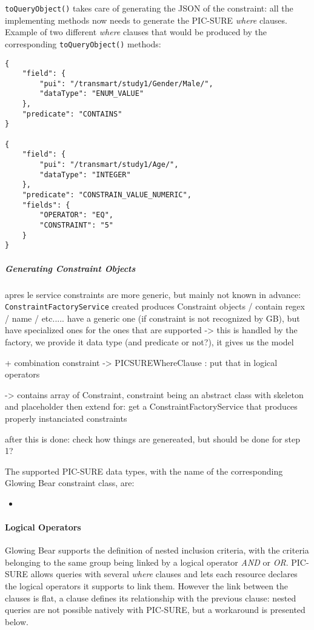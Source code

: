 \verb|toQueryObject()| takes care of generating the JSON of the constraint: all the implementing methods now needs to generate the PIC-SURE \emph{where} clauses.
Example of two different \emph{where} clauses that would be produced by the corresponding \verb|toQueryObject()| methods:
\begin{verbatim}
{
    "field": {
        "pui": "/transmart/study1/Gender/Male/",
        "dataType": "ENUM_VALUE"
    },
    "predicate": "CONTAINS"
}

{
    "field": {
        "pui": "/transmart/study1/Age/",
        "dataType": "INTEGER"
    },
    "predicate": "CONSTRAIN_VALUE_NUMERIC",
    "fields": {
        "OPERATOR": "EQ",
        "CONSTRAINT": "5"
    }
}
\end{verbatim}

\subparagraph{Generating Constraint Objects}

apres le service
constraints are more generic, but mainly not known in advance: \verb|ConstraintFactoryService| created
produces Constraint objects / contain regex / name / etc.....
have a generic one (if constraint is not recognized by GB), but have specialized ones for the ones that are supported
-> this is handled by the factory, we provide it data type (and predicate or not?), it gives us the model




+ combination constraint -> PICSUREWhereClause : put that in logical operators

-> contains array of Constraint, constraint being an abstract class with skeleton and placeholder
then extend for: 
get a ConstraintFactoryService that produces properly instanciated constraints

after this is done: check how things are genereated, but should be done for step 1? 


The supported PIC-SURE data types, with the name of the corresponding Glowing Bear constraint class, are:
\begin{itemize}
    \item \verb||
    
\end{itemize}


\paragraph{Logical Operators}
Glowing Bear supports the definition of nested inclusion criteria, with the criteria belonging to the same group being linked by a logical operator \emph{AND} or \emph{OR}.
PIC-SURE allows queries with several \emph{where} clauses and lets each resource declares the logical operators it supports to link them. 
However the link between the clauses is flat, a clause defines its relationship with the previous clause: nested queries are not possible natively with PIC-SURE, but a workaround is presented below.

